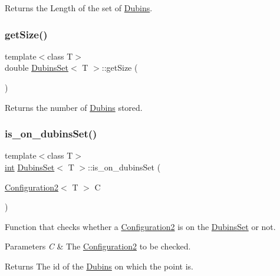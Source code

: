 Returns the Length of the set of {\ttfamily \mbox{\hyperlink{class_dubins}{Dubins}}}. 

\mbox{\label{class_dubins_set_a41f7dbb6b82c8822e427ee1a3059b8ca}} 
\subsubsection{\texorpdfstring{getSize()}{getSize()}}
{\footnotesize\ttfamily template$<$class T$>$ \\
double \mbox{\hyperlink{class_dubins_set}{Dubins\+Set}}$<$ T $>$\+::get\+Size (\begin{DoxyParamCaption}{ }\end{DoxyParamCaption})\hspace{0.3cm}{\ttfamily [inline]}}



Returns the number of {\ttfamily \mbox{\hyperlink{class_dubins}{Dubins}}} stored. 

\mbox{\label{class_dubins_set_ad651ad84f4de5a395f63152ee663dc02}} 
\subsubsection{\texorpdfstring{is\_on\_dubinsSet()}{is\_on\_dubinsSet()}}
{\footnotesize\ttfamily template$<$class T$>$ \\
\mbox{\hyperlink{draw_8hh_aa620a13339ac3a1177c86edc549fda9b}{int}} \mbox{\hyperlink{class_dubins_set}{Dubins\+Set}}$<$ T $>$\+::is\+\_\+on\+\_\+dubins\+Set (\begin{DoxyParamCaption}\item[{\mbox{\hyperlink{class_configuration2}{Configuration2}}$<$ T $>$}]{C }\end{DoxyParamCaption})\hspace{0.3cm}{\ttfamily [inline]}}



Function that checks whether a {\ttfamily \mbox{\hyperlink{class_configuration2}{Configuration2}}} is on the {\ttfamily \mbox{\hyperlink{class_dubins_set}{Dubins\+Set}}} or not. 


\begin{DoxyParams}{Parameters}
{\em C} & The {\ttfamily \mbox{\hyperlink{class_configuration2}{Configuration2}}} to be checked. \\
\hline
\end{DoxyParams}
\begin{DoxyReturn}{Returns}
The id of the {\ttfamily \mbox{\hyperlink{class_dubins}{Dubins}}} on which the point is. 
\end{DoxyReturn}
\mbox{\label{class_dubins_set_ac6014ed731c39a23df08a4ec2c41ae0f}} 

